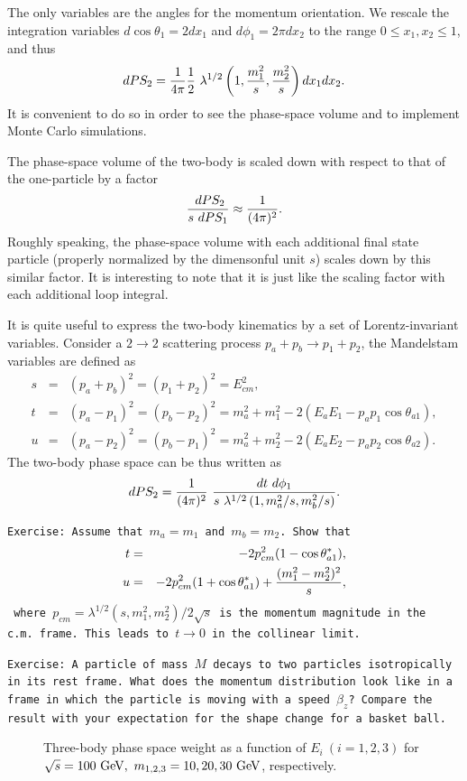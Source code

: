 \documentclass[12pt,prd,aps,floats,preprintnumbers,preprint,superscriptaddress,floatfix,nofootinbib]{revtex4}
\def\gev{{\rm GeV}}
\def\be{\begin{equation}}
\def\ee{\end{equation}}
\def\bea{\begin{eqnarray}}
\def\eea{\end{eqnarray}}
\begin{document}
The only variables are the angles for the momentum orientation.
We  rescale the integration variables $d\cos\theta_1=2dx_1$
and $d\phi_1=2\pi dx_2$ to the range $0\le x_1, x_2 \le 1$, and thus
\bea
dPS_2  = {1\over 4\pi}{1\over 2}\ 
\lambda^{1/2}\left(1,{m_1^2\over s},{m_2^2\over s}\right) 
dx_1 dx_2.
\eea
It is convenient to do so in order 
to see the phase-space volume and to implement Monte Carlo simulations.

The phase-space volume of the two-body is scaled down 
with respect to that of the one-particle by a factor 
\be
{ \ dPS_2\over s\ dPS_1} \approx {1\over (4\pi)^2} .
\ee
Roughly speaking, the phase-space volume with each additional
final state particle (properly normalized by the dimensonful
unit $s$) scales down by this similar factor. It is interesting
to note that it is just like the scaling factor with each
additional loop integral.

It is quite useful to express the two-body kinematics by a set
of Lorentz-invariant variables.
Consider a $2\to 2$ scattering process $p_a + p_b\to p_1 + p_2$, 
the Mandelstam variables are defined as
\bea
\nonumber
s&=&(p_a+p_b)^2=(p_1+p_2)^2=E^2_{cm},\\
t&=&(p_a-p_1)^2=(p_b-p_2)^2=m_a^2+m_1^2-2(E_a E_1-p_ap_1\cos\theta_{a1}) ,\\
\nonumber
u&=&(p_a-p_2)^2=(p_b-p_1)^2=m_a^2+m_2^2-2(E_a E_2-p_ap_2\cos\theta_{a2}).
\eea
The two-body phase space can be thus written as
\be
dPS_2 = {1\over (4\pi)^2}\ 
{dt\ d\phi_1
\over s\ \lambda^{1/2}\left(1,{m_a^2/s},{m_b^2/ s}\right)}.
\ee

\noindent
{\tt Exercise: Assume that $m_a=m_1$ and  $m_b=m_2$. Show that 
\bea
\nonumber
t&=& -2 p_{cm}^2 (1- \cos\theta^*_{a1}) ,\\
\nonumber
u&=& -2 p_{cm}^2 (1+ \cos\theta^*_{a1}) + {(m_1^2-m_2^2)^2\over s},
\eea
where $p_{cm}=\lambda^{1/2}(s,m_1^2,m_2^2)/2\sqrt s$ is the momentum 
magnitude in the\\
 c.m.~frame.  This leads to $t\to 0$ in the collinear limit.}

\vskip 0.3cm
\noindent
{\tt Exercise: A particle of mass $M$ decays to two particles 
isotropically in its rest frame. What does the momentum distribution look
like in a frame in which the particle is moving with a speed $\beta_z$?
Compare the result with your expectation for the shape change for a
basket ball.
}

\begin{center}
\begin{figure}[tb]
\caption{Three-body phase space weight as a function of $E_i\ (i=1,2,3)$
for $\sqrt s=100\ \gev,\ m_{1,2,3}=10,20,30\ \gev$, respectively.
\label{3body}}
\end{figure}
\end{center}
\end{document}

